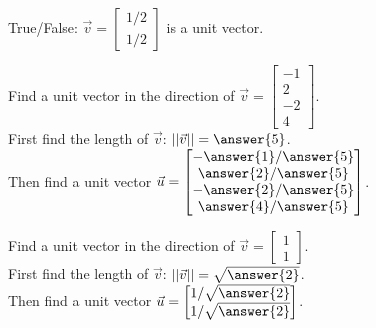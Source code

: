 \documentclass{ximera}
\begin{document}
  	  		             \begin{question} True/False: $\vec{v} = \begin{bmatrix} 1/2\\1/2\end{bmatrix}$ is a unit vector.
  	  		             	
  	  		             	\begin{multipleChoice}
  	  		             	\end{multipleChoice}
  	  		             \end{question}
  	  		               \begin{question} Find a unit vector in the direction of $\vec{v}=\begin{bmatrix} -1\\2\\-2\\4\end{bmatrix}$.\\
  	  		               	
  	  		               	First find the length of $\vec{v}$: $||\vec{v}|| = \answer{5}$.\vspace{10pt}\\
  	  		               	
  	  		               	Then find a unit vector $\vec{u} = \begin{bmatrix} -\answer{1}/\answer{5} \\ \answer{2}/\answer{5}\\ -\answer{2}/\answer{5} \\ \answer{4}/\answer{5}\end{bmatrix}$.
  	  		               	
  	  		              \end{question}
  	  		                 \begin{question} Find a unit vector in the direction of $\vec{v}=\begin{bmatrix} 1\\1\end{bmatrix}$.\\
  	  		                 	
  	  		                 	First find the length of $\vec{v}$: $||\vec{v}|| = \sqrt{\answer{2}}$.\vspace{10pt}\\
  	  		                 	
  	  		                 	Then find a unit vector $\vec{u} = \begin{bmatrix} 1/\sqrt{\answer{2}} \\ 1/\sqrt{\answer{2}}\\ \end{bmatrix}$.
  	  		                 	
  	  		                 \end{question}
  	  		            
  
\end{document}
